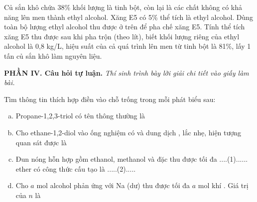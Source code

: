 \documentclass[12pt,a4paper]{article}
\begin{document}
\begin{ex}
Củ sắn khô chứa 38\% khối lượng là tinh bột, còn lại là các chất không có khả năng lên men thành ethyl alcohol. Xăng E5 có 5\% thể tích là ethyl alcohol. Dùng toàn bộ lượng ethyl alcohol thu được ở trên để pha chế xăng E5. Tính thể tích xăng E5 thu được sau khi pha trộn (theo lít), biết khối lượng riêng của ethyl alcohol là 0,8 kg/L, hiệu suất của cả quá trình lên men từ tinh bột là 81\%, lấy 1 tấn củ sắn khô làm nguyên liệu.
\end{ex}

\bigskip
\noindent\textbf{\large PHẦN IV. Câu hỏi tự luận.}
\textit{Thí sinh trình bày lời giải chi tiết vào giấy làm bài.}
\vspace{0.2cm}

\begin{ex}
Tìm thông tin thích hợp điền vào chỗ trống trong mỗi phát biểu sau:
\begin{enumerate}[a)]
    \item Propane-1,2,3-triol có tên thông thường là \dotfill
    \item Cho ethane-1,2-diol vào ống nghiệm có  và dung dịch , lắc nhẹ, hiện tượng quan sát được là \dotfill
    \item Đun nóng hỗn hợp gồm ethanol, methanol và  đặc thu được tối đa ....(1)...... ether có công thức cấu tạo là .....(2).....
    \item Cho $a$ mol alcohol  phản ứng với Na (dư) thu được tối đa $a$ mol khí . Giá trị của $n$ là \dotfill
\end{enumerate}

\vspace{3.5cm}

\end{ex}
\end{document}

